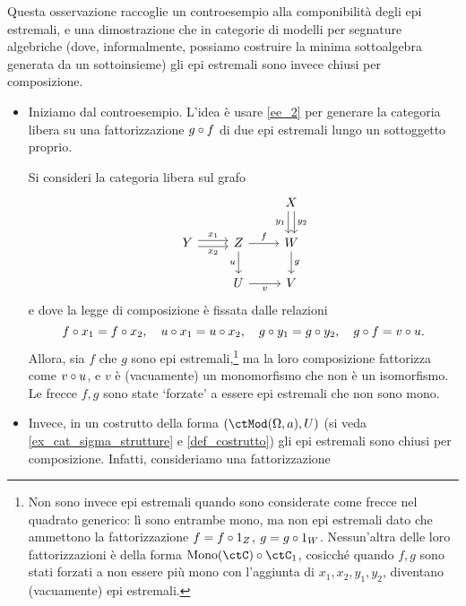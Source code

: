 \begin{remark}\label{compo_estremali}
	Questa osservazione raccoglie un controesempio alla componibilità degli epi estremali, e una dimostrazione che in categorie di modelli per segnature algebriche (dove, informalmente, possiamo costruire la minima sottoalgebra generata da un sottoinsieme) gli epi estremali sono invece chiusi per composizione.
	\begin{itemize}
		\item Iniziamo dal controesempio. L'idea è usare \ref{ee_2} per generare la categoria libera su una fattorizzazione $g\circ f$ di due epi estremali lungo un sottoggetto proprio. 
		
		Si consideri la categoria libera sul grafo 
\[\begin{tikzcd}
	&& X \\
	Y & Z & W \\
	& U & V
	\arrow["{y_2}", shift left=1, from=1-3, to=2-3]
	\arrow["{y_1}"', shift right=1, from=1-3, to=2-3]
	\arrow["{x_2}"', shift right=1, from=2-1, to=2-2]
	\arrow["{x_1}", shift left=1, from=2-1, to=2-2]
	\arrow["f", from=2-2, to=2-3]
	\arrow["u"', from=2-2, to=3-2]
	\arrow["g", from=2-3, to=3-3]
	\arrow["v"', from=3-2, to=3-3]
\end{tikzcd}\]
		e dove la legge di composizione è fissata dalle relazioni 
		\[f \circ x_1 = f \circ x_2, \quad u \circ x_1 = u \circ x_2, \quad g \circ y_1 = g \circ y_2, \quad g \circ f = v \circ u.\]
		Allora, sia $f$ che $g$ sono epi estremali,\footnote{Non sono invece epi estremali quando sono considerate come frecce nel quadrato generico: lì sono entrambe mono, ma non epi estremali dato che ammettono la fattorizzazione $f = f\circ 1_Z$, $g = g\circ 1_W$. Nessun'altra delle loro fattorizzazioni è della forma $\Mono[\ctC]\cmp \ctC_1$, cosicché quando $f,g$ sono stati forzati a non essere più mono con l'aggiunta di $x_1,x_2,y_1,y_2$, diventano (vacuamente) epi estremali.} ma la loro composizione fattorizza come $v\circ u$, e $v$ è (vacuamente) un monomorfismo che non è un isomorfismo. Le frecce $f,g$ sono state `forzate' a essere epi estremali che non sono mono.
		\item Invece, in un costrutto della forma $(\ctMod(\Omega,a),U)$ (si veda \ref{ex_cat_sigma_strutture} e \ref{def_costrutto}) gli epi estremali sono chiusi per composizione. Infatti, consideriamo una fattorizzazione 

\end{itemize}
\end{remark}
